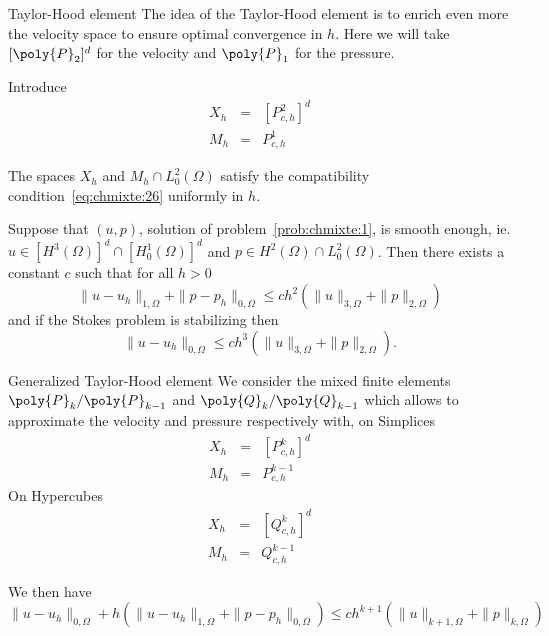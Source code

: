   \begin{block}{Taylor-Hood element}
    The idea of the Taylor-Hood element is to enrich even more the velocity
    space to ensure optimal convergence in $h$. Here we will take $[\poly{P}_2]^d$ for
    the velocity and $\poly{P}_1$ for the pressure.
  \end{block}


  Introduce
  \begin{eqnarray}
    \label{eq:chmixte:39}
    X_h &=&  [P^2_{c,h}]^d\\
    M_h &=& P^1_{c,h}
  \end{eqnarray}

  \begin{lemma}
    \label{lem:3}
    The spaces $X_h$ and $M_h \cap L^2_0(\Omega)$ satisfy the compatibility
    condition~\eqref{eq:chmixte:26} uniformly in $h$.
  \end{lemma}

  \begin{theorem}
    \label{thr:chmixte:3}
    Suppose that $(u,p)$, solution of problem~\ref{prob:chmixte:1}, is smooth enough,
    ie. $u \in [H^3(\Omega)]^d \cap [H^1_0(\Omega)]^d$ and $p\in H^2(\Omega)
    \cap L^2_0(\Omega)$. Then there exists a constant $c$ such that for all $h
    >0$
    \begin{equation}
      \label{eq:chmixte:40}
      \| u- u_h \|_{1,\Omega} + \|p-p_h\|_{0,\Omega} \leq c h^2 (\|u\|_{3,\Omega}
      +\|p\|_{2,\Omega})
    \end{equation}
    and if the Stokes problem is stabilizing then
    \begin{equation}
      \label{eq:chmixte:41}
      \|u-u_h\|_{0,\Omega} \leq c h^3 ( \|u\|_{3,\Omega} +\|p\|_{2,\Omega}).
    \end{equation}
  \end{theorem}


  \begin{block}{Generalized Taylor-Hood element}
    We consider the mixed finite elements $\poly{P}_k/\poly{P}_{k-1}$ and
    $\poly{Q}_k/\poly{Q}_{k-1}$ which allows to approximate the velocity and
    pressure respectively with, on Simplices
    \begin{eqnarray}
        \label{eq:chmixte:42}
        X_h &=&  [P^{k}_{c,h}]^d\\
        M_h &=& P^{k-1}_{c,h}
      \end{eqnarray}
      On Hypercubes
      \begin{eqnarray}
        \label{eq:chmixte:43}
        X_h &=&  [Q^{k}_{c,h}]^d\\
        M_h &=& Q^{k-1}_{c,h}
      \end{eqnarray}

      We then have
      \begin{equation}
      \label{eq:chmixte:40}
      \|u-u_h\|_{0,\Omega} + h ( \| u- u_h \|_{1,\Omega} + \|p-p_h\|_{0,\Omega} ) \leq c h^{k+1} (\|u\|_{k+1,\Omega}
      +\|p\|_{k,\Omega})
    \end{equation}
  \end{block}


